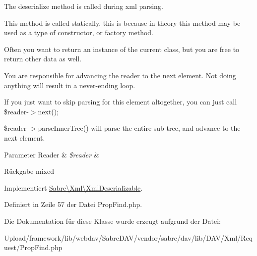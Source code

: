 The deserialize method is called during xml parsing.

This method is called statically, this is because in theory this method may be used as a type of constructor, or factory method.

Often you want to return an instance of the current class, but you are free to return other data as well.

You are responsible for advancing the reader to the next element. Not doing anything will result in a never-\/ending loop.

If you just want to skip parsing for this element altogether, you can just call \$reader-\/$>$next();

\$reader-\/$>$parse\+Inner\+Tree() will parse the entire sub-\/tree, and advance to the next element.


\begin{DoxyParams}[1]{Parameter}
Reader & {\em \$reader} & \\
\hline
\end{DoxyParams}
\begin{DoxyReturn}{Rückgabe}
mixed 
\end{DoxyReturn}


Implementiert \mbox{\hyperlink{interface_sabre_1_1_xml_1_1_xml_deserializable_a19e0eca545b9a0d93f7d6b69085ade30}{Sabre\textbackslash{}\+Xml\textbackslash{}\+Xml\+Deserializable}}.



Definiert in Zeile 57 der Datei Prop\+Find.\+php.



Die Dokumentation für diese Klasse wurde erzeugt aufgrund der Datei\+:\begin{DoxyCompactItemize}
\item 
Upload/framework/lib/webdav/\+Sabre\+D\+A\+V/vendor/sabre/dav/lib/\+D\+A\+V/\+Xml/\+Request/Prop\+Find.\+php\end{DoxyCompactItemize}
